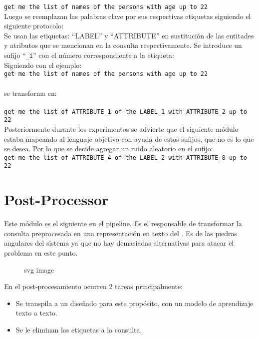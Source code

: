 \verb|get me the list of names of the persons with age up to 22|\\

Luego se reemplazan las palabras clave por sus respectivas etiquetas siguiendo el siguiente protocolo:\\

Se usan las etiquetas: ``LABEL'' y ``ATTRIBUTE'' en sustitución de las entitades y atributos que se mencionan en la consulta respectivamente. Se introduce un sufijo ``\verb|_i|'' con el número correspondiente a la etiqueta:\\

Siguiendo con el ejemplo:\\
\verb|get me the list of names of the persons with age up to 22|\\
\\
se transforma en:\\
\\
\verb|get me the list of ATTRIBUTE_1 of the LABEL_1 with ATTRIBUTE_2 up to 22|
\\

Posteriormente durante los experimentos se advierte que el siguiente m\'odulo estaba mapeando al lenguaje objetivo con ayuda de estos sufijos, que no es lo que se desea. Por lo que se decide agregar un ruido aleatorio en el sufijo:\\

\verb|get me the list of ATTRIBUTE_4 of the LABEL_2 with ATTRIBUTE_8 up to 22|\\



\section{Post-Processor}
\label{post-proc}


Este m\'odulo es el siguiente en el pipeline. Es el responsable de transformar la consulta preprocesada en una representaci\'on en texto del . Es de las piedras angulares del sistema ya que no hay demasiadas alternativas para atacar el problema en este punto.

\begin{figure}[htbp]
  \centering
  
  \caption{svg image}
\end{figure}

En el post-procesamiento ocurren 2 tareas principalmente:

\begin{itemize}
    \item Se transpila a un  diseñado para este propósito, con un modelo de aprendizaje texto a texto.
    
    \item Se le eliminan las etiquetas a la consulta.
\end{itemize}


